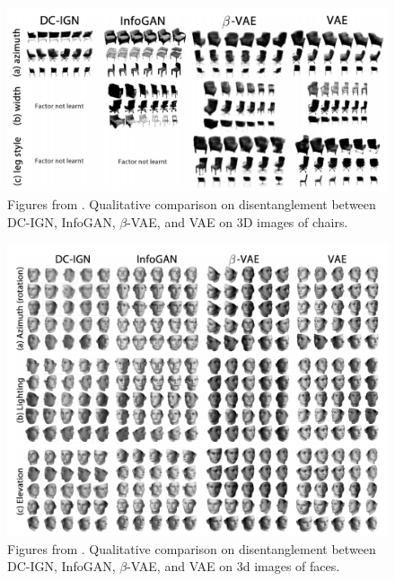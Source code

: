                 \begin{figure}[H] \label{fig:3d_chairs}
                    \centering
                    \includegraphics[width=1\textwidth]{imgs/3d_chairs.png}
                    \caption{Figures from \cite{higgins2016beta}. Qualitative comparison on disentanglement between DC-IGN\citep{kulkarni2015deep}, InfoGAN\citep{chen2016infogan}, $\beta$-VAE\citep{higgins2016beta}, and VAE\citep{kingma2014adam} on 3D images of chairs.}
                \end{figure}  
                
                \begin{figure}[H] \label{fig:3d_faces}
                    \centering
                    \includegraphics[width=1\textwidth]{imgs/3d_faces.png}
                    \caption{Figures from \cite{higgins2016beta}. Qualitative comparison on disentanglement between DC-IGN\citep{kulkarni2015deep}, InfoGAN\citep{chen2016infogan}, $\beta$-VAE\citep{higgins2016beta}, and VAE\citep{kingma2014adam} on 3d images of faces.}
                \end{figure}  
                
